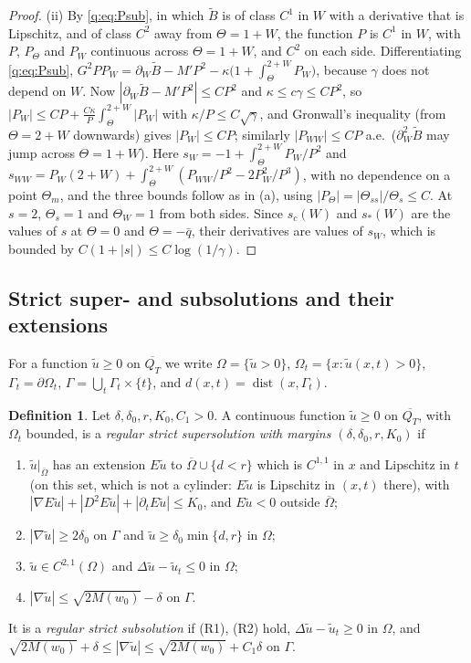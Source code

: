\documentclass[11pt]{amsart}
\theoremstyle{definition}
\newtheorem{definition}[theorem]{Definition}
\theoremstyle{remark}
\begin{document}
\begin{proof}
(ii) By \eqref{q:eq:Psub}, in which $\tilde B$ is of class $C^1$ in $W$ with a
derivative that is Lipschitz, and of class $C^2$ away from $\Theta=1+W$, the function $P$
is $C^1$ in $W$, with $P$, $P_\Theta$ and $P_W$ continuous across $\Theta=1+W$, and $C^2$ on each
side. Differentiating \eqref{q:eq:Psub},
$G^2PP_W=\partial_W\tilde B-M'P^2-\kappa\big(1+\int_\Theta^{2+W}P_W\big)$, because $\gamma$
does not depend on $W$. Now $|\partial_W\tilde B-M'P^2|\le CP^2$ and
$\kappa\le c\gamma\le CP^2$, so $|P_W|\le CP+\frac{C\kappa}{P}\int_\Theta^{2+W}|P_W|$ with
$\kappa/P\le C\sqrt\gamma$, and Gronwall's inequality (from $\Theta=2+W$ downwards)
gives $|P_W|\le CP$; similarly $|P_{WW}|\le CP$ a.e.\ ($\partial_W^2\tilde B$ may jump across
$\Theta=1+W$). Here $s_W=-1+\int_\Theta^{2+W}P_W/P^2$ and
$s_{WW}=P_W(2+W)+\int_\Theta^{2+W}(P_{WW}/P^2-2P_W^2/P^3)$, with no dependence on a point
$\Theta_m$, and the three bounds follow as in (a), using $|P_\Theta|=|\Theta_{ss}|/\Theta_s\le C$.
At $s=2$, $\Theta_s=1$ and $\Theta_W=1$ from both sides. Since $s_c(W)$ and $s_*(W)$ are the values
of $s$ at $\Theta=0$ and $\Theta=-\bar q$, their derivatives are values of $s_W$, which is bounded by
$C(1+|s|)\le C\log(1/\gamma)$.
\end{proof}

\subsection{Strict super- and subsolutions and their extensions}

For a function $\tilde u\ge0$ on $\overline{Q_T}$ we write $\Omega=\{\tilde u>0\}$,
$\Omega_t=\{x:\tilde u(x,t)>0\}$, $\Gamma_t=\partial\Omega_t$,
$\Gamma=\bigcup_t\Gamma_t\times\{t\}$, and $d(x,t)=\operatorname{dist}(x,\Gamma_t)$.

\begin{definition}\label{q:def:strict}
Let $\delta,\delta_0,r,K_0,C_1>0$. A continuous function $\tilde u\ge0$ on
$\overline{Q_T}$, with $\Omega_t$ bounded, is a \emph{regular strict supersolution with
margins $(\delta,\delta_0,r,K_0)$} if
\begin{enumerate}
\item[(R1)] $\tilde u|_{\overline\Omega}$ has an extension $E\tilde u$ to
$\overline\Omega\cup\{d<r\}$ which is $C^{1,1}$ in $x$ and Lipschitz in $t$ (on this set,
which is not a cylinder: $E\tilde u$ is Lipschitz in $(x,t)$ there), with
$|\nabla E\tilde u|+|D^2E\tilde u|+|\partial_tE\tilde u|\le K_0$, and $E\tilde u<0$ outside
$\overline\Omega$;
\item[(R2)] $|\nabla\tilde u|\ge2\delta_0$ on $\Gamma$ and $\tilde u\ge\delta_0\min\{d,r\}$ in $\Omega$;
\item[(R3)] $\tilde u\in C^{2,1}(\Omega)$ and $\Delta\tilde u-\tilde u_t\le0$ in $\Omega$;
\item[(R4)] $|\nabla\tilde u|\le\sqrt{2M(w_0)}-\delta$ on $\Gamma$.
\end{enumerate}
It is a \emph{regular strict subsolution} if (R1), (R2) hold,
$\Delta\tilde u-\tilde u_t\ge0$ in $\Omega$, and
$\sqrt{2M(w_0)}+\delta\le|\nabla\tilde u|\le\sqrt{2M(w_0)}+C_1\delta$ on $\Gamma$.
\end{definition}
\end{document}
